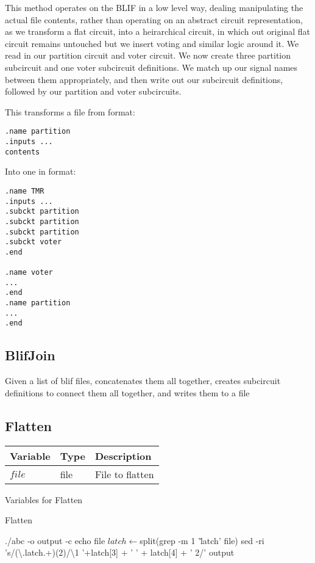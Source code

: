 \documentclass[12pt,final,oneside]{article} %
\begin{document}
This method operates on the \ac{BLIF} in a low level way, dealing manipulating the actual file contents, rather than operating on an abstract circuit representation, as we transform a flat circuit, into a heirarchical circuit, in which out original flat circuit remains untouched but we insert voting and similar logic around it.
We read in our partition circuit and voter circuit. We now create three partition subcircuit and one voter subcircuit definitions. We match up our signal names between them appropriately, and then write out our subcircuit definitions, followed by our partition and voter subcircuits.

This transforms a file from format:
\begin{lstlisting}
.name partition
.inputs ...
contents
\end{lstlisting}
Into one in format:
\begin{lstlisting}
.name TMR
.inputs ...
.subckt partition
.subckt partition
.subckt partition
.subckt voter
.end

.name voter
...
.end
.name partition
...
.end
\end{lstlisting}

\subsection{BlifJoin}
Given a list of blif files, concatenates them all together, creates
subcircuit definitions to connect them all together, and writes them to a file
\subsection{Flatten}

\begin{algorithm}
    \begin{center}
        \begin{tabularx}{\linewidth}{llX}
        \toprule
        Variable & Type & Description\\
        \midrule
        $file$ & file & File to flatten\\
        \bottomrule
        \end{tabularx}
        \caption{Variables for Flatten}
        \label{varFlatten}
    \end{center}
   \caption{Flatten}\label{Flatten}
   \begin{algorithmic}[1]
         \State ./abc -o output -c echo file
         \State $latch \gets $split(grep -m 1 '\.latch' file)
            \State sed -ri 's/(\textbackslash.latch.+)(2)/\textbackslash1 '+latch[3] + ' ' + latch[4] + ' 2/' output
         \EndIf
      \EndProcedure
   \end{algorithmic}
\end{algorithm}
\end{document}
